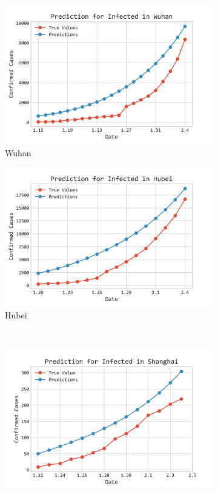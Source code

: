 \documentclass[12pt]{mcmthesis}
\begin{document}
\begin{figure}[htbp]
    \centering
    \begin{subfigure}[t]{0.45\textwidth}
        \includegraphics[width=1.0\textwidth]{figure/Wuhan_Comp.png}
        \caption{Wuhan}
        \label{fig:Val_Wuhan}
    \end{subfigure}
    \begin{subfigure}[t]{0.45\textwidth}
        \includegraphics[width=1.0\textwidth]{figure/Hubei_Comp.png}
        \caption{Hubei}
        \label{fig:Val_Hubei}
    \end{subfigure}
    \\
    \begin{subfigure}[t]{0.45\textwidth}
        \includegraphics[width=1.0\textwidth]{figure/Shanghai_Validation.png}

\end{subfigure}
\end{figure}
\end{document}
